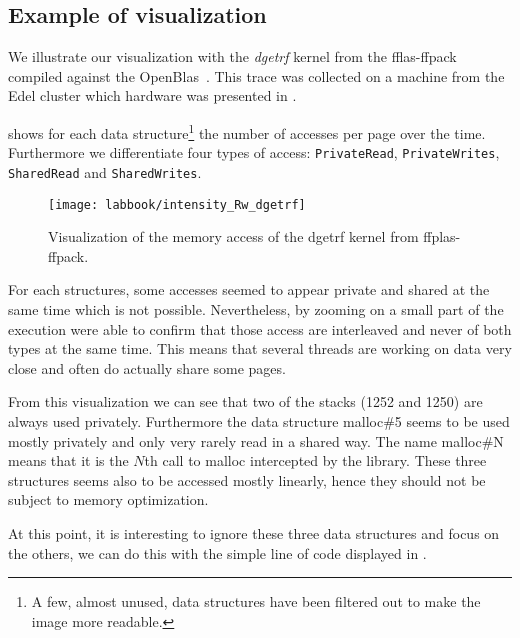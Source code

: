 \subsection{Example of visualization}

We illustrate our visualization with the \emph{dgetrf} kernel from the fflas-ffpack~\cite{group16FFLASFFPACK} compiled against the OpenBlas~\cite{Chothia16OpenBlas}.
This trace was collected on a machine from the Edel cluster which hardware was presented in .

 shows for each data structure\footnote{
    A few, almost unused, data structures have been filtered out to make the image more readable.}
    the number of accesses per page over the time.
Furthermore we differentiate four types of access: \texttt{PrivateRead}, \texttt{PrivateWrites}, \texttt{SharedRead} and \texttt{SharedWrites}.

\begin{figure}[htb]
    \centering
    \texttt{[image: labbook/intensity\_Rw\_dgetrf]}
    \caption{Visualization of the memory access of the dgetrf kernel from ffplas-ffpack.}
    \label{fig:dgetrf-intensity}
\end{figure}

For each structures, some accesses seemed to appear private and shared at the same time which is not possible.
Nevertheless, by zooming on a small part of the execution were able to confirm that those access are interleaved and never of both types at the same time.
This means that several threads are working on data very close and often do actually share some pages.

From this visualization we can see that two of the stacks (1252 and 1250) are always used privately.
Furthermore the data structure malloc\#5 seems to be used mostly privately and only very rarely read in a shared way.
The name malloc\#N means that it is the $N$th call to malloc intercepted by the library.
These three structures seems also to be accessed mostly linearly, hence they should not be subject to memory optimization.

At this point, it is interesting to ignore these three data structures and focus on the others, we can do this with the simple line of code displayed in .



